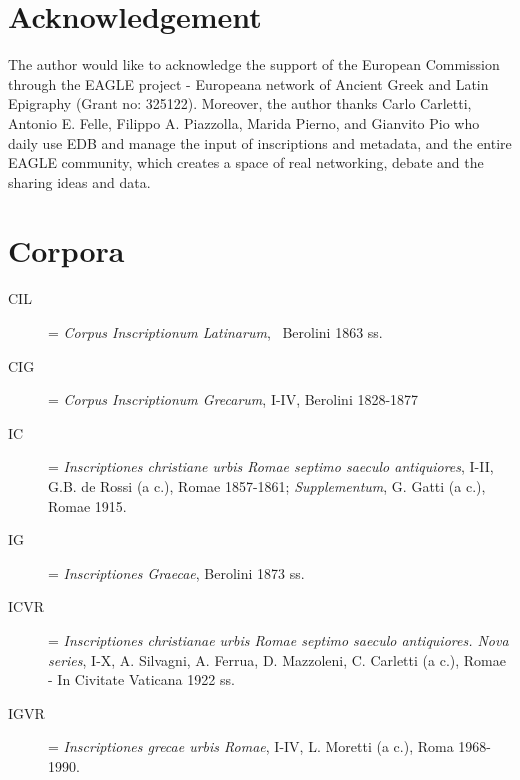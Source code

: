 \documentclass[amsthm,ebook]{saparticle}
\begin{document}
\nocite{felle_fenomeni_2007,felle_esperienze_2012,jory_problems_1975}

\section*{Acknowledgement}
The author would like to acknowledge the support of the European Commission through the
EAGLE project - Europeana network of Ancient Greek and Latin Epigraphy (Grant no: 325122). Moreover, the author thanks
Carlo Carletti, Antonio E. Felle, Filippo A. Piazzolla, Marida Pierno, and Gianvito Pio who daily use EDB and manage
the input of inscriptions and metadata, and the entire EAGLE community, which creates a space of real networking,
debate and the sharing ideas and data.

\section*{Corpora}
\begin{description}
\item[ CIL ] = \emph{Corpus Inscriptionum Latinarum}, \ Berolini 1863 ss.
\item[CIG ] = \emph{Corpus Inscriptionum Grecarum}, I-IV, Berolini 1828-1877
\item[IC] = \emph{Inscriptiones christiane urbis Romae septimo saeculo antiquiores}, I-II, G.B. de Rossi (a c.), Romae 1857-1861; \emph{Supplementum}, G. Gatti (a c.), Romae 1915. 
\item[IG] = \emph{Inscriptiones Graecae}, Berolini 1873 ss.
\item[ICVR] = \emph{Inscriptiones christianae urbis Romae septimo saeculo antiquiores. Nova series}, I-X, A. Silvagni, A. Ferrua, D. Mazzoleni, C. Carletti (a c.), Romae - In Civitate Vaticana 1922 ss.
\item[IGVR] = \emph{Inscriptiones grecae urbis Romae}, I-IV, L. Moretti (a c.), Roma 1968-1990. 

\end{description}



\end{document}
